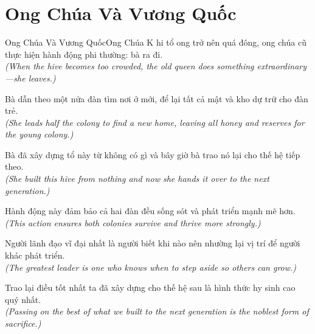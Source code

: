 \section{Ong Chúa Và Vương Quốc}
\begin{truyen}{Ong Chúa Và Vương Quốc}{Ong Chúa}
K hi tổ ong trở nên quá đông, ong chúa cũ thực hiện hành động phi thường: bà ra đi.\\
\textit{(When the hive becomes too crowded, the old queen does something extraordinary—she leaves.)}

Bà dẫn theo một nửa đàn tìm nơi ở mới, để lại tất cả mật và kho dự trữ cho đàn trẻ.\\
\textit{(She leads half the colony to find a new home, leaving all honey and reserves for the young colony.)}

Bà đã xây dựng tổ này từ không có gì và bây giờ bà trao nó lại cho thế hệ tiếp theo.\\
\textit{(She built this hive from nothing and now she hands it over to the next generation.)}

Hành động này đảm bảo cả hai đàn đều sống sót và phát triển mạnh mẽ hơn.\\
\textit{(This action ensures both colonies survive and thrive more strongly.)}

Người lãnh đạo vĩ đại nhất là người biết khi nào nên nhường lại vị trí để người khác phát triển.\\
\textit{(The greatest leader is one who knows when to step aside so others can grow.)}

\end{truyen}
\begin{baihoc}
  Trao lại điều tốt nhất ta đã xây dựng cho thế hệ sau là hình thức hy sinh cao quý nhất.\\
  \textit{(Passing on the best of what we built to the next generation is the noblest form of sacrifice.)}
\end{baihoc}

